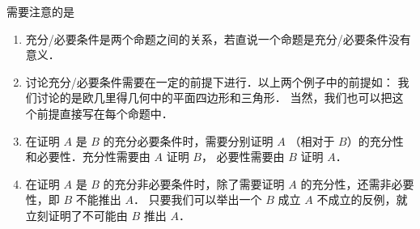 需要注意的是 
\begin{enumerate}
\item 充分/必要条件是两个命题之间的关系，若直说一个命题是充分/必要条件没有意义．
\item 讨论充分/必要条件需要在一定的前提下进行．以上两个例子中的前提如： 我们讨论的是欧几里得几何中的平面四边形和三角形． 当然，我们也可以把这个前提直接写在每个命题中．
\item 在证明 $A$ 是 $B$ 的充分必要条件时，需要分别证明 $A$ （相对于 $B$）的充分性和必要性．充分性需要由 $A$ 证明 $B$， 必要性需要由 $B$ 证明 $A$． 
\item 在证明 $A$ 是 $B$ 的充分非必要条件时，除了需要证明 $A$ 的充分性，还需非必要性，即 $B$ 不能推出 $A$． 只要我们可以举出一个 $B$ 成立 $A$ 不成立的反例，就立刻证明了不可能由 $B$ 推出 $A$． 
\end{enumerate}


